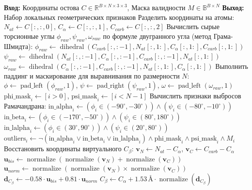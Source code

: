 \documentclass[12pt, a4paper]{article}
\begin{document}
\begin{algorithm}[h]
\caption{Извлечение геометрии остова белка}
\label{alg:geometry}
\begin{algorithmic}[1]
\Statex \textbf{Вход:} Координаты остова $C \in \mathbb{R}^{B \times N \times 3 \times 3}$, Маска валидности $M \in \mathbb{B}^{B \times N}$
\Statex \textbf{Выход:} Набор локальных геометрических признаков
\State Разделить координаты на атомы: $N_{at} \gets C[:, :, 0]$, $C_\alpha \gets C[:, :, 1]$, $C_{carb} \gets C[:, :, 2]$
\State Вычислить сырые торсионные углы $\phi_{raw}, \psi_{raw}, \omega_{raw}$ по формуле двугранного угла (метод Грама-Шмидта):
\State \quad $\phi_{raw} \gets \operatorname{dihedral}(C_{carb}[:, :-1], N_{at}[:, 1:], C_\alpha[:, 1:], C_{carb}[:, 1:])$
\State \quad $\psi_{raw} \gets \operatorname{dihedral}(N_{at}[:, :-1], C_\alpha[:, :-1], C_{carb}[:, :-1], N_{at}[:, 1:])$
\State \quad $\omega_{raw} \gets \operatorname{dihedral}(C_\alpha[:, :-1], C_{carb}[:, :-1], N_{at}[:, 1:], C_\alpha[:, 1:])$
\State Выполнить паддинг и маскирование для выравнивания по размерности $N$:
\State \quad $\phi \gets \operatorname{pad\_left}(\phi_{raw}, 1)$, $\psi \gets \operatorname{pad\_right}(\psi_{raw}, 1)$, $\omega \gets \operatorname{pad\_left}(\omega_{raw}, 1)$
\State \quad $\text{phi\_mask}_i \gets [i > 0]$, $\text{psi\_mask}_i \gets [i < N-1]$ 
\State Вычислить признаки выбросов Рамачандрана:
\State \quad $\text{in\_alpha}_i \gets (\phi_i \in (-90^\circ, -30^\circ)) \land (\psi_i \in (-80^\circ, -10^\circ))$
\State \quad $\text{in\_beta}_i \gets (\phi_i \in (-170^\circ, -50^\circ)) \land (\psi_i \in (80^\circ, 180^\circ))$
\State \quad $\text{in\_lalpha}_i \gets (\phi_i \in (30^\circ, 90^\circ)) \land (\psi_i \in (20^\circ, 80^\circ))$
\State \quad $\text{outliers}_i \gets \neg(\text{in\_alpha}_i \lor \text{in\_beta}_i \lor \text{in\_lalpha}_i) \land \text{phi\_mask}_i \land \text{psi\_mask}_i \land M_i$
\State Восстановить координаты виртуального $C_\beta$:
\State \quad $\mathbf{v}_N \gets N_{at} - C_\alpha$, $\mathbf{v}_C \gets C_{carb} - C_\alpha$
\State \quad $\mathbf{u}_{bis} \gets \operatorname{normalize}\left(\operatorname{normalize}(\mathbf{v}_N) + \operatorname{normalize}(\mathbf{v}_C)\right)$
\State \quad $\mathbf{u}_{norm} \gets \operatorname{normalize}\left(\operatorname{normalize}(\mathbf{v}_N) \times \operatorname{normalize}(\mathbf{v}_C)\right)$
\State \quad $\mathbf{d}_{C_\beta} \gets -0.58 \cdot \mathbf{u}_{bis} + 0.81 \cdot \mathbf{u}_{norm}$
\State \quad $C_\beta \gets C_\alpha + 1.53\,\text{\AA} \cdot \operatorname{normalize}(\mathbf{d}_{C_\beta})$

\end{algorithmic}
\end{algorithm}
\end{document}
